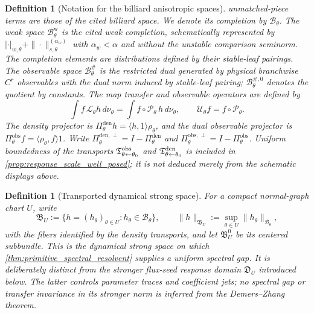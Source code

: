 \documentclass[11pt]{amsart}
\theoremstyle{compactplain}
\theoremstyle{compactdefinition}
\newtheorem{definition}[theorem]{Definition}
\newtheorem*{definition*}{Definition}
\theoremstyle{compactremark}
\newcommand{\Bcal}{\mathcal B}
\newcommand{\Bweak}{\mathcal B^{\mathrm w}}
\newcommand{\Ltransfer}{\mathscr L}
\newcommand{\Pcal}{\mathcal P}
\newcommand{\Piden}{\Pi^{\mathrm{den}}}
\newcommand{\Pidenperp}{\Pi^{\mathrm{den},\perp}}
\newcommand{\Piobs}{\Pi^{\mathrm{obs}}}
\newcommand{\Piobsperp}{\Pi^{\mathrm{obs},\perp}}
\begin{document}
\begin{definition}[Notation for the billiard anisotropic spaces]
unmatched-piece terms are those of the cited billiard space.  We denote its
completion by $\Bcal_\theta$.  The weak space \(\Bweak_\theta\) is the cited
weak completion, schematically represented by
\(|\cdot|_{w,\theta}+\|\cdot\|_{s,\theta}^{(\alpha_w)}\) with
\(\alpha_w<\alpha\) and without the unstable comparison seminorm.  The
completion elements are distributions defined by their stable-leaf pairings.
The
observable space $\Bcal_\theta^\#$ is the restricted dual generated by physical
branchwise \(C^r\) observables with the dual norm induced by stable-leaf
pairing; \(\Bcal_\theta^{\#,0}\) denotes the quotient by constants.  The map
transfer and observable operators are defined by
\begin{equation}
  \int f\,\Ltransfer_\theta h\,d\nu_\theta
  =\int f\circ\Pcal_\theta\,h\,d\nu_\theta,
  \qquad
  \mathscr U_\theta f=f\circ\Pcal_\theta .
\end{equation}
The density projector is
\(\Piden_\theta h=\langle h,1\rangle\rho_\theta\), and the dual observable
projector is
\(\Piobs_\theta f=\langle\rho_\theta,f\rangle1\).  Write
\(\Pidenperp_\theta=I-\Piden_\theta\) and
\(\Piobsperp_\theta=I-\Piobs_\theta\).
Uniform boundedness of the transports
\(\mathfrak T^{\rm obs}_{\theta\leftarrow\theta_0}\) and
\(\mathfrak T^{\rm den}_{\theta\leftarrow\theta_0}\) is included in
\cref{prop:response_scale_well_posed}; it is not deduced merely from
the schematic displays above.
\end{definition}

\begin{definition*}[Transported dynamical strong space]
For a compact normal-graph chart \(U\), write
\[
 \mathfrak B_U
 :=\{h=(h_\theta)_{\theta\in U}:h_\theta\in\Bcal_\theta\},
 \qquad
 \|h\|_{\mathfrak B_U}
 :=\sup_{\theta\in U}\|h_\theta\|_{\Bcal_\theta},
\]
with the fibers identified by the density transports, and let
\(\mathfrak B_U^0\) be its centered subbundle.  This is the dynamical strong
space on which \cref{thm:primitive_spectral_resolvent} supplies a uniform
spectral gap.  It is deliberately distinct from the stronger flux-seed
response domain \(\mathfrak D_U\) introduced below.  The latter controls
parameter traces and coefficient jets; no spectral gap or transfer invariance
in its stronger norm is inferred from the Demers--Zhang theorem.
\end{definition*}
\end{document}
